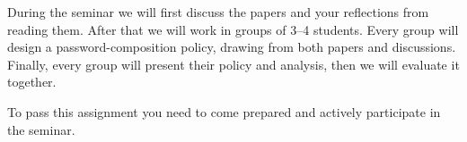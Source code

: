 During the seminar we will first discuss the papers and your reflections from 
reading them.
After that we will work in groups of 3--4 students.
Every group will design a password-composition policy, drawing from both papers
and discussions.
Finally, every group will present their policy and analysis, then we will 
evaluate it together.

To pass this assignment you need to come prepared and actively participate in 
the seminar.


\subsubsection*{\ackname}




\printbibliography{}
